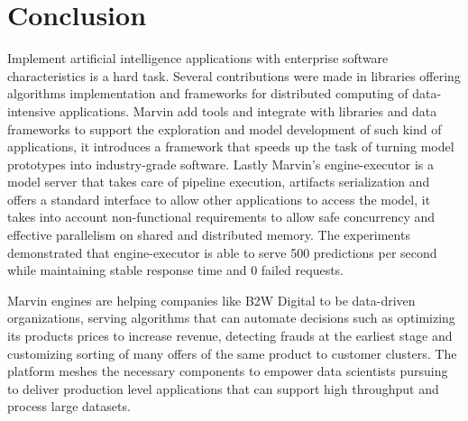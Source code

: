 \documentclass[twoside,11pt]{article}
\begin{document}
\section{Conclusion}
Implement artificial intelligence applications with enterprise software characteristics is a hard task. Several contributions were made in libraries offering algorithms implementation and frameworks for distributed computing of data-intensive applications. Marvin add tools and integrate with libraries and data frameworks to support the exploration and model development of such kind of applications, it introduces a framework that speeds up the task of turning model prototypes into industry-grade software. Lastly Marvin's engine-executor is a model server that takes care of pipeline execution, artifacts serialization and offers a standard interface to allow other applications to access the model, it takes into account non-functional requirements to allow safe concurrency and effective parallelism on shared and distributed memory. The experiments demonstrated that engine-executor is able to serve 500 predictions per second while maintaining stable response time and 0 failed requests.

Marvin engines are helping companies like B2W Digital to be data-driven organizations, serving algorithms that can automate decisions such as optimizing its products prices to increase revenue, detecting frauds at the earliest stage and customizing sorting of many offers of the same product to customer clusters. The platform meshes the necessary components to empower data scientists pursuing to deliver production level applications that can support high throughput and process large datasets.


\newpage



\end{document}
